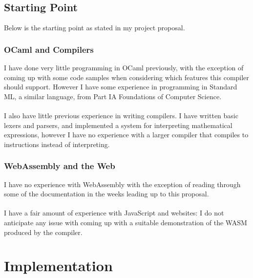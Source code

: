 \documentclass[12pt,twoside,notitlepage]{report}
\begin{document}

\section{Starting Point}
Below is the starting point as stated in my project proposal.

\subsection{OCaml and Compilers}
I have done very little programming in OCaml previously, with the exception of coming up with some code samples when considering which features this compiler should support. However I have some experience in programming in Standard ML, a similar language, from Part IA Foundations of Computer Science.
\\\\
I also have little previous experience in writing compilers. I have written basic lexers and parsers, and implemented a system for interpreting mathematical expressions, however I have no experience with a larger compiler that compiles to instructions instead of interpreting.

\subsection{WebAssembly and the Web}
I have no experience with WebAssembly with the exception of reading through some of the documentation in the weeks leading up to this proposal.
\\\\
I have a fair amount of experience with JavaScript and websites: I do not anticipate any issue with coming up with a suitable demonstration of the WASM produced by the compiler.

\clearpage
\chapter{Implementation}

\end{document}
